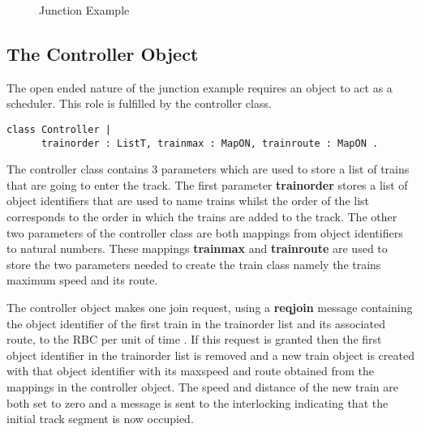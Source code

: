 \begin{figure}[h!]
\begin{center}
\end{center} 
\caption{Junction Example}
\label{fig:junctionexample}
\end{figure}

\subsection*{The Controller Object}
The open ended nature of the junction example requires an object to act as a scheduler. This role is fulfilled by the controller class. 

\begin{lstlisting}[caption = "Controller Class"]
class Controller | 
      trainorder : ListT, trainmax : MapON, trainroute : MapON .
\end{lstlisting}

The controller class contains 3 parameters which are used to store a list of trains that are going to enter the track. The first parameter \textbf{trainorder} stores a list of object identifiers that are used to name trains whilst the order of the list corresponds to the order in which the trains are added to the track. The other two parameters of the controller class are both mappings from object identifiers to natural numbers. These mappings \textbf{trainmax} and \textbf{trainroute} are used to store the two parameters needed to create the train class namely the trains maximum speed and its route.

The controller object makes one join request, using a \textbf{reqjoin} message containing the object identifier of the first train in the trainorder list and its associated route, to the RBC per unit of time . If this request is granted then the first object identifier in the trainorder list is removed and a new train object is created with that object identifier with its maxspeed and route obtained from the mappings in the controller object. The speed and distance of the new train are both set to zero and a message is sent to the interlocking indicating that the initial track segment is now occupied. 


